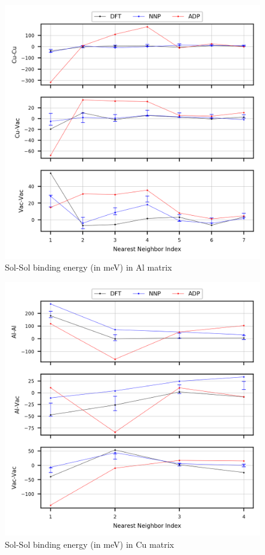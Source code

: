\documentclass{article}
\begin{document}
\begin{figure}[H]%
\centering%
\includegraphics[width=540px]{./figures/solsol_in_al.png}%
\caption{Sol{-}Sol binding energy (in meV) in Al matrix}%
\end{figure}

%


\begin{figure}[H]%
\centering%
\includegraphics[width=540px]{./figures/solsol_in_cu.png}%
\caption{Sol{-}Sol binding energy (in meV) in Cu matrix}%
\end{figure}
\end{document}
